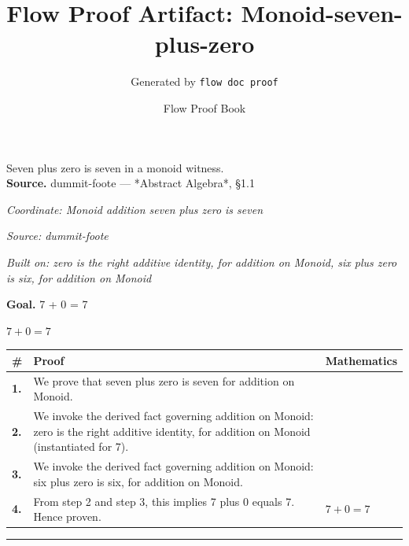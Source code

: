 \documentclass[11pt]{article}
\title{Flow Proof Artifact: Monoid-seven-plus-zero}
\author{Generated by \texttt{flow doc proof}}
\date{Flow Proof Book}
\theoremstyle{definition}
\begin{document}
\maketitle
Seven plus zero is seven in a monoid witness.\\[0.5em]
\textbf{Source.} dummit-foote — *Abstract Algebra*, §1.1\\[0.5em]
\bigskip
{}\par
\smallskip\noindent\textit{Coordinate: Monoid \cdot addition \cdot seven plus zero is seven}\par
\smallskip\noindent\textit{Source: dummit-foote}\par
\smallskip\noindent\textit{Built on: zero is the right additive identity, for addition on Monoid, six plus zero is six, for addition on Monoid}\par
\medskip
\noindent\textbf{Goal.} 7 + 0 = 7\par
\noindent$\displaystyle 7 + 0 = 7$\par
\medskip
\noindent
\begin{tabular}{@{} >{\raggedright\arraybackslash}p{} >{\raggedright\arraybackslash}p{} >{\raggedleft\arraybackslash}p{} @{}}
\textbf{\#} & \textbf{Proof} & \textbf{Mathematics} \\
\midrule
\textbf{1.} & We prove that seven plus zero is seven for addition on Monoid. & \\[0.45em]
\textbf{2.} & We invoke the derived fact governing addition on Monoid: zero is the right additive identity, for addition on Monoid (instantiated for 7). & \\[0.45em]
\textbf{3.} & We invoke the derived fact governing addition on Monoid: six plus zero is six, for addition on Monoid. & \\[0.45em]
\textbf{4.} & From step 2 and step 3, this implies 7 plus 0 equals 7. Hence proven. & $\displaystyle 7 + 0 = 7$ \\[0.45em]
\bottomrule
\end{tabular}
\label{thm:Monoid-addition-seven_plus_zero_is_seven}
\par\medskip\hrule
\end{document}
